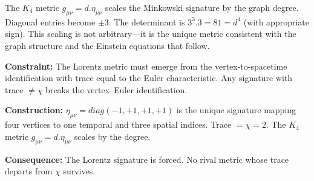 \documentclass[11pt,a4paper]{book}
\def\cdot{.}%
\def\mathrm#1{#1}%
\begin{document}
The $K_4$ metric $g_{\mu\nu} = d \cdot \eta_{\mu\nu}$ scales the Minkowski signature by the graph degree. Diagonal entries become $\pm 3$. The determinant is $3^3 \cdot 3 = 81 = d^4$ (with appropriate sign). This scaling is not arbitrary---it is the unique metric consistent with the graph structure and the Einstein equations that follow.

\textbf{Constraint:} The Lorentz metric must emerge from the vertex-to-spacetime identification with trace equal to the Euler characteristic. Any signature with trace $\neq \chi$ breaks the vertex--Euler identification.

\textbf{Construction:} $\eta_{\mu\nu} = \mathrm{diag}(-1,+1,+1,+1)$ is the unique signature mapping four vertices to one temporal and three spatial indices. Trace $= \chi = 2$. The $K_4$ metric $g_{\mu\nu} = d \cdot \eta_{\mu\nu}$ scales by the degree.

\textbf{Consequence:} The Lorentz signature is forced. No rival metric whose trace departs from $\chi$ survives.
\end{document}
